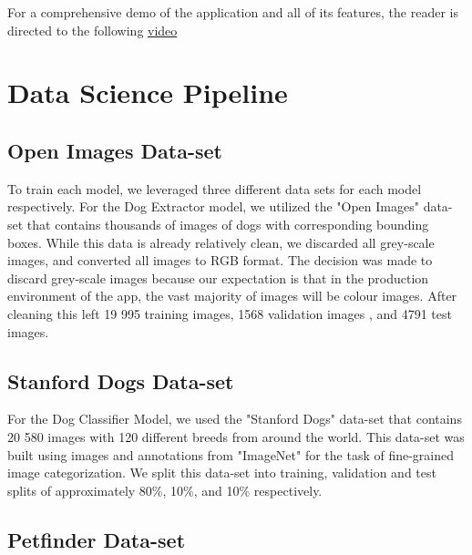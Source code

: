 \documentclass{article}
\begin{document}
\noindent  For a comprehensive demo of the application and all of its features, the reader is directed to the following \href{https://youtu.be/jVjqX4sfAKU}{video}



\newpage

\section{Data Science Pipeline}

\subsection{Open Images Data-set}

To train each model, we leveraged three different data sets for each model respectively.  For the Dog Extractor model, we utilized the "Open Images" \cite{openimages} data-set that contains thousands of images of dogs with corresponding bounding boxes.  While this data is already relatively clean, we discarded all grey-scale images, and converted all images to RGB format.  The decision was made to discard grey-scale images because our expectation is that in the production environment of the app, the vast majority of images will be colour images.  After cleaning this left 19 995 training images, 1568 validation images , and 4791 test images.

\subsection{Stanford Dogs Data-set}

For the Dog Classifier Model, we used the "Stanford Dogs" data-set \cite{stanforddogs} that contains 20 580 images with 120 different breeds from around the world. This data-set was built using images and annotations from "ImageNet" \cite{imagenet} for the task of fine-grained image categorization.  We split this data-set into training, validation and test splits of approximately 80\%, 10\%, and 10\% respectively.

\subsection{Petfinder Data-set}
\end{document}
